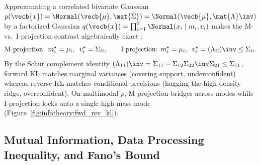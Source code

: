 \documentclass[../../../../master.tex]{subfiles}
\begin{document}
\begin{intuition}
\label{int:infotheory:gauss_proj}
Approximating a correlated bivariate Gaussian $p(\vecb{x}) = \Normal(\vecb{\mu}, \mat{\Sigma}) = \Normal(\vecb{\mu}, \mat{\Lambda}\inv)$ by a factorized Gaussian $q(\vecb{x}) = \prod_{i=1}^2 \Normal(x_i \mid m_i, v_i)$ makes the M- vs.\ I-projection contrast algebraically exact :
\begin{equation}
\label{eq:infotheory:factorized_gauss}
  \text{M-projection: } m_i^\star = \mu_i,\;\; v_i^\star = \Sigma_{ii},
  \qquad
  \text{I-projection: } m_i^\star = \mu_i,\;\; v_i^\star = (\Lambda_{ii})\inv \le \Sigma_{ii}.
\end{equation}
By the Schur complement identity $(\Lambda_{11})\inv = \Sigma_{11} - \Sigma_{12}\Sigma_{22}\inv\Sigma_{21} \le \Sigma_{11}$, forward KL matches marginal variances (covering support, underconfident) whereas reverse KL matches conditional precisions (hugging the high-density ridge, overconfident). On multimodal $p$, M-projection bridges across modes while I-projection locks onto a single high-mass mode (Figure~\ref{fig:infotheory:fwd_rev_kl}).
\end{intuition}


\subsection{Mutual Information, Data Processing Inequality, and Fano's Bound}
\end{document}
